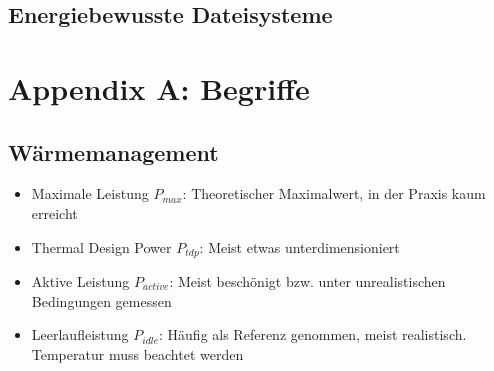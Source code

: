 \subsection{Energiebewusste Dateisysteme}



\section{Appendix A: Begriffe}

\subsection{Wärmemanagement}
\begin{itemize}
	\item Maximale Leistung \(P_{max}\): Theoretischer Maximalwert, in der Praxis kaum erreicht
	\item Thermal Design Power \(P_{tdp}\): Meist etwas unterdimensioniert
	\item Aktive Leistung \(P_{active}\): Meist beschönigt bzw. unter unrealistischen Bedingungen gemessen
	\item Leerlaufleistung \(P_{idle}\): Häufig als Referenz genommen, meist realistisch. Temperatur muss beachtet werden
\end{itemize}


